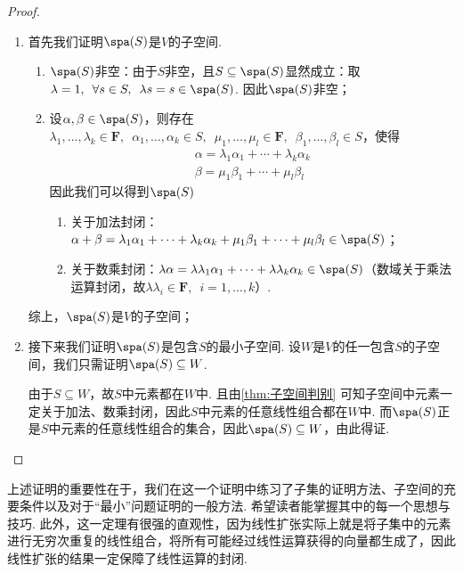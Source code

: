 \begin{proof}
    \begin{enumerate}
        \item 首先我们证明$\spa(S)$是$V$的子空间.
              \begin{enumerate}
                  \item $\spa(S)$非空：由于$S$非空，且$S\subseteq\spa(S)$显然成立：取$\lambda=1,\enspace\forall s\in S,\enspace \lambda s=s\in\spa(S)$. 因此$\spa(S)$非空；

                  \item 设$\alpha,\beta\in\spa(S)$，则存在$\lambda_1,\ldots,\lambda_k\in\mathbf{F},\enspace \alpha_1,\ldots,\alpha_k\in S,\enspace\mu_1,\ldots,\mu_l\in\mathbf{F},\enspace\beta_1,\ldots,\beta_l\in S$，使得
                        \begin{gather*}
                            \alpha=\lambda_1\alpha_1+\cdots+\lambda_k\alpha_k \\
                            \beta=\mu_1\beta_1+\cdots+\mu_l\beta_l
                        \end{gather*}
                        因此我们可以得到$\spa(S)$
                        \begin{enumerate}
                            \item 关于加法封闭：$\alpha+\beta=\lambda_1\alpha_1+\cdots+\lambda_k\alpha_k+\mu_1\beta_1+\cdots+\mu_l\beta_l\in\spa(S)$；

                            \item 关于数乘封闭：$\lambda\alpha=\lambda\lambda_1\alpha_1+\cdots+\lambda\lambda_k\alpha_k\in\spa(S)$（数域关于乘法运算封闭，故$\lambda\lambda_i\in\mathbf{F},\enspace i=1,\ldots,k$）.
                        \end{enumerate}
              \end{enumerate}
              综上，$\spa(S)$是$V$的子空间；

        \item 接下来我们证明$\spa(S)$是包含$S$的最小子空间. 设$W$是$V$的任一包含$S$的子空间，我们只需证明$\spa(S)\subseteq W$.

              由于$S\subseteq W$，故$S$中元素都在$W$中. 且由\autoref{thm:子空间判别} 可知子空间中元素一定关于加法、数乘封闭，因此$S$中元素的任意线性组合都在$W$中. 而$\spa(S)$正是$S$中元素的任意线性组合的集合，因此$\spa(S)\subseteq W$，由此得证.
    \end{enumerate}
\end{proof}

上述证明的重要性在于，我们在这一个证明中练习了子集的证明方法、子空间的充要条件以及对于``最小''问题证明的一般方法. 希望读者能掌握其中的每一个思想与技巧. 此外，这一定理有很强的直观性，因为线性扩张实际上就是将子集中的元素进行无穷次重复的线性组合，将所有可能经过线性运算获得的向量都生成了，因此线性扩张的结果一定保障了线性运算的封闭.

